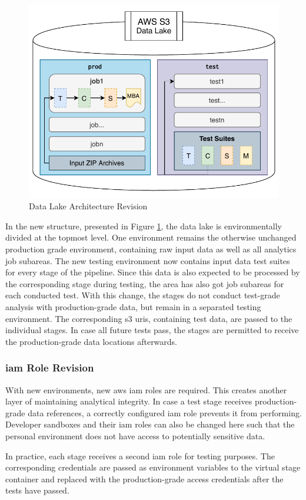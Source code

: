 \begin{figure}[h!]
	\centering
	\includegraphics[width=0.67\linewidth]{main-matter/img/5-data-lake-new}
	\caption{Data Lake Architecture Revision}
	\label{fig:5-new-data-lake}
\end{figure}

In the new structure, presented in Figure \ref{fig:5-new-data-lake}, the data lake is environmentally divided at the topmost level. One environment remains the otherwise unchanged production grade environment, containing raw input data as well as all analytics job subareas. The new testing environment now contains input data test suites for every stage of the pipeline. Since this data is also expected to be processed by the corresponding stage during testing, the area has also got job subareas for each conducted test.
\newpage
With this change, the stages do not conduct test-grade analysis with production-grade data, but remain in a separated testing environment. The corresponding \ac{s3} \acp{uri}, containing test data, are passed to the individual stages. In case all future tests pass, the stages are permitted to receive the production-grade data locations afterwards.

\subsubsection{\acs{iam} Role Revision}
With new environments, new \ac{aws} \ac{iam} roles are required. This creates another layer of maintaining analytical integrity. In case a test stage receives production-grade data references, a correctly configured \ac{iam} role prevents it from performing. Developer sandboxes and their \ac{iam} roles can also be changed here such that the personal environment does not have access to potentially sensitive data.

In practice, each stage receives a second \ac{iam} role for testing purposes. The corresponding credentials are passed as environment variables to the virtual stage container and replaced with the production-grade access credentials after the tests have passed. \\\

